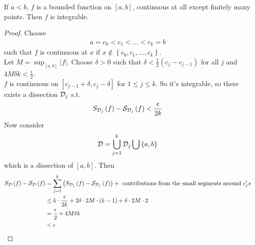 \documentclass[a4paper]{article}
\begin{document}
\begin{thm}
If $a<b$, $f$ is a bounded function on $\left[a,b\right]$, continuous at all except finitely many points. Then $f$ is integrable.
\begin{proof}
Choose
\begin{equation*}
\begin{aligned}
a=c_0 < c_1 < ... < c_k = b
\end{aligned}
\end{equation*}
such that $f$ is continuous at $x$ if $x \not\in\left\{c_0, c_1, ..., c_k\right\}$.\\
Let $M = \sup_{\left[a,b\right]} |f|$. Choose $\delta > 0$ such that $\delta < \frac{1}{2}\left(c_j - c_{j-1}\right)$ for all $j$ and $4M\delta k < \frac{\epsilon}{2}$.\\
$f$ is continuous on $\left[c_{j-1}+\delta, c_j-\delta\right]$ for $1\leq j \leq k$. So it's integrable, so there exists a dissection $\mathcal{D}_j$ s.t.
\begin{equation*}
\begin{aligned}
S_{\mathcal{D}_j} \left(f\right) - \mathcal{S}_{\mathcal{D}_j} \left(f\right) < \frac{\epsilon}{2k}
\end{aligned}
\end{equation*}
Now consider
\begin{equation*}
\begin{aligned}
\mathcal{D} = \bigcup_{j=1}^k \mathcal{D}_j \bigcup \left\{a,b\right\}
\end{aligned}
\end{equation*}
which is a dissection of $\left[a,b\right]$. Then
\begin{equation*}
\begin{aligned}
S_{\mathcal{D}} \left(f\right) - \mathcal{S}_{\mathcal{D}}\left(f\right) &= \sum_{j=1}^k \left(S_{\mathcal{D}_j} \left(f\right) - \mathcal{S}_{\mathcal{D}_j} \left(f\right)\right) + \text{  contributions from the small segments around  } c_j's\\
&\leq k\cdot \frac{\epsilon}{2k} + 2\delta \cdot 2M \cdot \left(k-1\right) + \delta \cdot 2M \cdot 2\\
&= \frac{\epsilon}{2} + 4M\delta k\\
&< \epsilon
\end{aligned}
\end{equation*}
\end{proof}
\end{thm}
\end{document}
